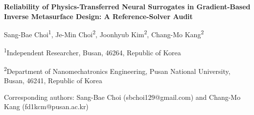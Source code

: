 \documentclass[11pt,a4paper]{article}
\begin{document}
\begin{center}

{\LARGE\bfseries Reliability of Physics-Transferred Neural Surrogates in Gradient-Based Inverse Metasurface Design: A Reference-Solver Audit\par}

\vspace{1.2em}

{\large {Sang-Bae Choi\textsuperscript{1}, Je-Min Choi\textsuperscript{2}, Joonhyub Kim\textsuperscript{2}, Chang-Mo Kang\textsuperscript{2}}\par}

\vspace{0.8em}

{\small\itshape

\textsuperscript{1}Independent Researcher, Busan, 46264, Republic of Korea\par

\textsuperscript{2}Department of Nanomechatronics Engineering, Pusan National University, Busan, 46241, Republic of Korea\par

}

\vspace{0.6em}

{\small Corresponding authors: Sang-Bae Choi (sbchoi129@gmail.com) and Chang-Mo Kang (fd1kcm@pusan.ac.kr)\par}

\end{center}
\end{document}
